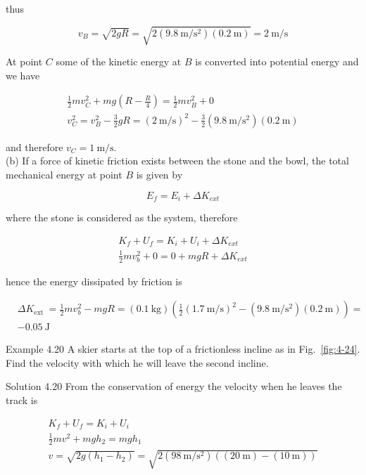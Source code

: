 \documentclass[10pt]{article}
\numberwithin{equation}{section}
\begin{document}
thus

$$
v_{B}=\sqrt{2 g R}=\sqrt{2\left(9.8 \mathrm{~m} / \mathrm{s}^{2}\right)(0.2 \mathrm{~m})}=2 \mathrm{~m} / \mathrm{s}
$$

At point $C$ some of the kinetic energy at $B$ is converted into potential energy and we have

$$
\begin{gathered}
\frac{1}{2} m v_{C}^{2}+m g\left(R-\frac{R}{4}\right)=\frac{1}{2} m v_{B}^{2}+0 \\
v_{C}^{2}=v_{B}^{2}-\frac{3}{2} g R=(2 \mathrm{~m} / \mathrm{s})^{2}-\frac{3}{2}\left(9.8 \mathrm{~m} / \mathrm{s}^{2}\right)(0.2 \mathrm{~m})
\end{gathered}
$$

and therefore $v_{C}=1 \mathrm{~m} / \mathrm{s}$.\\
(b) If a force of kinetic friction exists between the stone and the bowl, the total mechanical energy at point $B$ is given by

$$
E_{f}=E_{i}+\Delta K_{e x t}
$$

where the stone is considered as the system, therefore

$$
\begin{gathered}
K_{f}+U_{f}=K_{i}+U_{i}+\Delta K_{e x t} \\
\frac{1}{2} m v_{b}^{2}+0=0+m g R+\Delta K_{e x t}
\end{gathered}
$$

hence the energy dissipated by friction is

$$
\begin{aligned}
& \Delta K_{\text {ext }}=\frac{1}{2} m v_{b}^{2}-m g R=(0.1 \mathrm{~kg})\left(\frac{1}{2}(1.7 \mathrm{~m} / \mathrm{s})^{2}-\left(9.8 \mathrm{~m} / \mathrm{s}^{2}\right)(0.2 \mathrm{~m})\right)= \\
& -0.05 \mathrm{~J}
\end{aligned}
$$

Example 4.20 A skier starts at the top of a frictionless incline as in Fig.~\ref{fig:4-24}. Find the velocity with which he will leave the second incline.

Solution 4.20 From the conservation of energy the velocity when he leaves the track is

$$
\begin{gathered}
K_{f}+U_{f}=K_{i}+U_{i} \\
\frac{1}{2} m v^{2}+m g h_{2}=m g h_{1} \\
v=\sqrt{2 g\left(h_{1}-h_{2}\right)}=\sqrt{2\left(98 \mathrm{~m} / \mathrm{s}^{2}\right)((20 \mathrm{~m})-(10 \mathrm{~m}))}
\end{gathered}
$$
\end{document}
